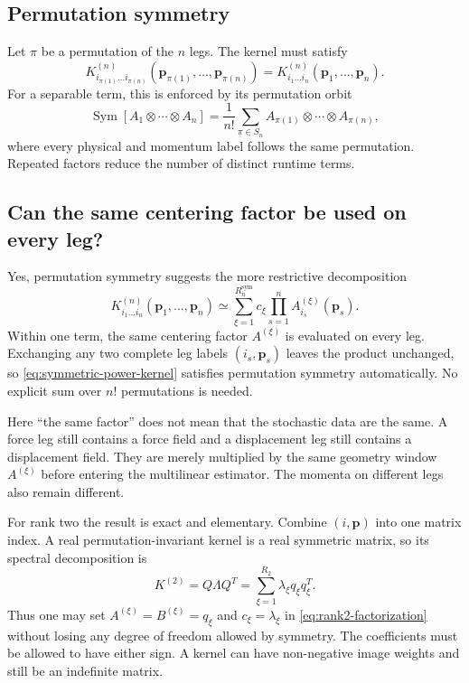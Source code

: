 \documentclass{article}
\begin{document}
\subsection{Permutation symmetry}
\label{sec:permutation}

Let $\pi$ be a permutation of the $n$ legs. The kernel must satisfy
\begin{equation}
    K^{(n)}_{i_{\pi(1)}\ldots i_{\pi(n)}}
    (\bm p_{\pi(1)},\ldots,\bm p_{\pi(n)})
    =
    K^{(n)}_{i_1\ldots i_n}
    (\bm p_1,\ldots,\bm p_n).
    \label{eq:permutation}
\end{equation}
For a separable term, this is enforced by its permutation orbit
\begin{equation}
    \operatorname{Sym}
    \left[
    A_1\otimes\cdots\otimes A_n
    \right]
    =
    \frac{1}{n!}\sum_{\pi\in S_n}
    A_{\pi(1)}\otimes\cdots\otimes A_{\pi(n)},
    \label{eq:symmetrized-term}
\end{equation}
where every physical and momentum label follows the same permutation.
Repeated factors reduce the number of distinct runtime terms.

\subsection{Can the same centering factor be used on every leg?}
\label{sec:symmetric-powers}

Yes, permutation symmetry suggests the more restrictive decomposition
\begin{equation}
    K^{(n)}_{i_1\ldots i_n}
    (\bm p_1,\ldots,\bm p_n)
    \simeq
    \sum_{\xi=1}^{R_n^{\mathrm{sym}}}c_\xi
    \prod_{s=1}^{n}
    A_{i_s}^{(\xi)}(\bm p_s).
    \label{eq:symmetric-power-kernel}
\end{equation}
Within one term, the same centering factor $A^{(\xi)}$ is evaluated on
every leg. Exchanging any two complete leg labels
$(i_s,\bm p_s)$ leaves the product unchanged, so
\autoref{eq:symmetric-power-kernel} satisfies permutation symmetry
automatically. No explicit sum over $n!$ permutations is needed.

Here ``the same factor'' does not mean that the stochastic data are the
same. A force leg still contains a force field and a displacement leg still
contains a displacement field. They are merely multiplied by the same
geometry window $A^{(\xi)}$ before entering the multilinear estimator.
The momenta on different legs also remain different.

For rank two the result is exact and elementary. Combine $(i,\bm p)$ into
one matrix index. A real permutation-invariant kernel is a real symmetric
matrix, so its spectral decomposition is
\begin{equation}
    K^{(2)}
    =
    Q\Lambda Q^T
    =
    \sum_{\xi=1}^{R_2}
    \lambda_\xi q_\xi q_\xi^T.
    \label{eq:symmetric-rank2-decomposition}
\end{equation}
Thus one may set $A^{(\xi)}=B^{(\xi)}=q_\xi$ and
$c_\xi=\lambda_\xi$ in \autoref{eq:rank2-factorization} without losing any
degree of freedom allowed by symmetry. The coefficients must be allowed to
have either sign. A kernel can have non-negative image weights and still be
an indefinite matrix.
\end{document}
